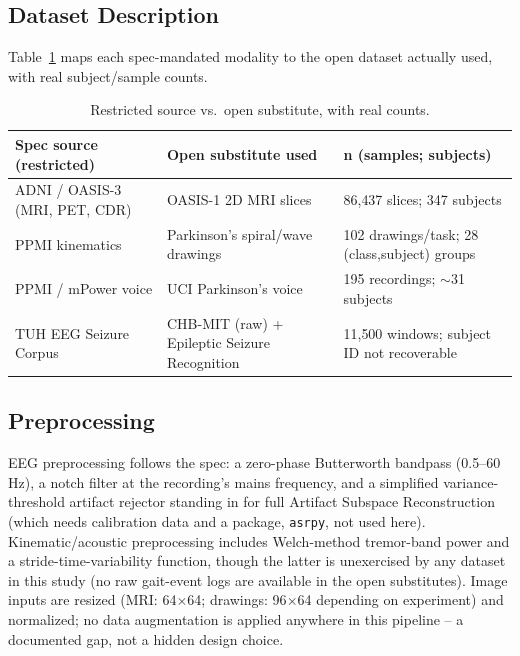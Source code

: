 \documentclass[conference]{IEEEtran}
\begin{document}
\subsection{Dataset Description}
Table~\ref{tab:datasources} maps each spec-mandated modality to the
open dataset actually used, with real subject/sample counts.

\begin{table}[!t]
\centering
\caption{Restricted source vs.\ open substitute, with real counts.}
\label{tab:datasources}
\small
\begin{tabular}{p{2.2cm}p{2.6cm}p{2.4cm}}
\toprule
\textbf{Spec source (restricted)} & \textbf{Open substitute used} & \textbf{n (samples; subjects)} \\
\midrule
ADNI / OASIS-3 (MRI, PET, CDR) & OASIS-1 2D MRI slices \cite{marcus2007oasis} & 86{,}437 slices; 347 subjects \\
PPMI kinematics & Parkinson's spiral/wave drawings & 102 drawings/task; 28 (class,subject) groups \\
PPMI / mPower voice & UCI Parkinson's voice \cite{little2009suitability} & 195 recordings; $\sim$31 subjects \\
TUH EEG Seizure Corpus & CHB-MIT (raw) \cite{shoeb2009application} + Epileptic Seizure Recognition \cite{andrzejak2001indications} & 11{,}500 windows; subject ID not recoverable \\
\bottomrule
\end{tabular}
\end{table}

\subsection{Preprocessing}
EEG preprocessing follows the spec: a zero-phase Butterworth bandpass
(0.5--60\,Hz), a notch filter at the recording's mains frequency, and a
simplified variance-threshold artifact rejector standing in for full
Artifact Subspace Reconstruction (which needs calibration data and a
package, \texttt{asrpy}, not used here). Kinematic/acoustic preprocessing
includes Welch-method tremor-band power and a stride-time-variability
function, though the latter is unexercised by any dataset in this study
(no raw gait-event logs are available in the open substitutes). Image
inputs are resized (MRI: 64$\times$64; drawings: 96$\times$64 depending
on experiment) and normalized; no data augmentation is applied anywhere
in this pipeline -- a documented gap, not a hidden design choice.
\end{document}

